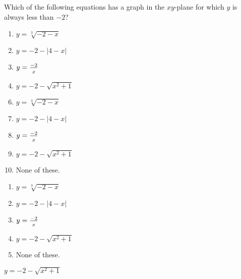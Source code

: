  
Which of the following equations has a graph in the $xy$-plane for which $y$ is always less than $-2$?


\ifsat
	\begin{enumerate}[label=\Alph*)]
		\item $y=\sqrt[3]{-2-x} $ 
		\item $y=-2-|4-x| $ 
		\item $y=\frac{-2}{\rule{0mm}{2.5mm}x} $ 
		\item $y=-2-\sqrt{x^2+1} $ %
	\end{enumerate}
\else
\fi

\ifacteven
	\begin{enumerate}[label=\textbf{\Alph*.},itemsep=\fill,align=left]
		\setcounter{enumii}{5}
		\item $y=\sqrt[3]{-2-x} $ 
		\item $y=-2-|4-x| $ 
		\item $y=\frac{-2}{\rule{0mm}{2.5mm}x} $ 
		\addtocounter{enumii}{1}
		\item $y=-2-\sqrt{x^2+1} $ %
		\item None of these. 
	\end{enumerate}
\else
\fi

\ifactodd
	\begin{enumerate}[label=\textbf{\Alph*.},itemsep=\fill,align=left]
		\item $y=\sqrt[3]{-2-x} $ 
		\item $y=-2-|4-x| $ 
		\item $y=\frac{-2}{\rule{0mm}{2.5mm}x} $ 
		\item $y=-2-\sqrt{x^2+1} $ %
		\item None of these. 
	\end{enumerate}
\else
\fi

\ifgridin
 $y=-2-\sqrt{x^2+1} $ %

\else
\fi


